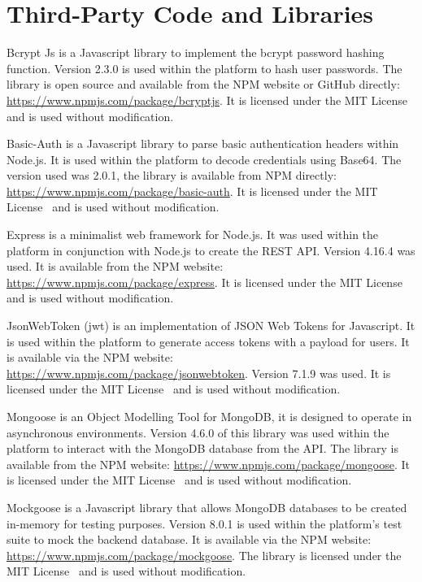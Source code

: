 \chapter{Third-Party Code and Libraries}
Bcrypt Js is a Javascript library to implement the bcrypt password hashing function. Version 2.3.0 is used within the platform to hash user passwords. The library is open source and available from the NPM website or GitHub directly: \url{https://www.npmjs.com/package/bcryptjs}. It is licensed under the MIT License~\cite{mit_license_ref} and is used without modification.

Basic-Auth is a Javascript library to parse basic authentication headers within Node.js. It is used within the platform to decode credentials using Base64. The version used was 2.0.1, the library is available from NPM directly: \url{https://www.npmjs.com/package/basic-auth}. It is licensed under the MIT License~\cite{mit_license_ref} and is used without modification.

Express is a minimalist web framework for Node.js. It was used within the platform in conjunction with Node.js to create the REST API. Version 4.16.4 was used. It is available from the NPM website: \url{https://www.npmjs.com/package/express}. It is licensed under the MIT License~\cite{mit_license_ref} and is used without modification.

JsonWebToken (jwt)  is an implementation of JSON Web Tokens for Javascript. It is used within the platform to generate access tokens with a payload for users. It is available via the NPM website: \url{https://www.npmjs.com/package/jsonwebtoken}. Version 7.1.9 was used. It is licensed under the MIT License~\cite{mit_license_ref} and is used without modification.

Mongoose is an Object Modelling Tool for MongoDB, it is designed to operate in asynchronous environments. Version 4.6.0 of this library was used within the platform to interact with the MongoDB database from the API. The library is available from the NPM website: \url{https://www.npmjs.com/package/mongoose}. It is licensed under the MIT License~\cite{mit_license_ref} and is used without modification.

Mockgoose is a Javascript library that allows MongoDB databases to be created in-memory for testing purposes. Version 8.0.1 is used within the platform's test suite to mock the backend database. It is available via the NPM website: \url{https://www.npmjs.com/package/mockgoose}. The library is licensed under the MIT License~\cite{mit_license_ref} and is used without modification.

